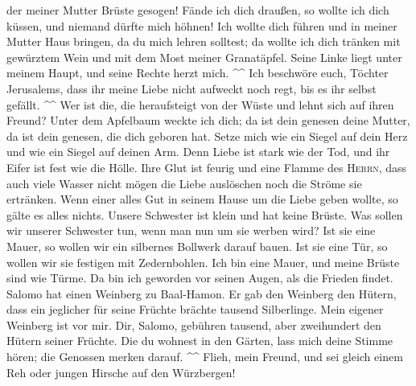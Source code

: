 der meiner Mutter Brüste gesogen! Fände ich dich draußen, so wollte ich
dich küssen, und niemand dürfte mich höhnen!  Ich wollte
dich führen und in meiner Mutter Haus bringen, da du mich lehren
solltest; da wollte ich dich tränken mit gewürztem Wein und mit dem Most
meiner Granatäpfel.  Seine Linke liegt unter meinem Haupt,
und seine Rechte herzt mich. \^{}\^{}  Ich beschwöre euch,
Töchter Jerusalems, dass ihr meine Liebe nicht aufweckt noch regt, bis
es ihr selbst gefällt. \^{}\^{}  Wer ist die, die
heraufsteigt von der Wüste und lehnt sich auf ihren Freund? Unter dem
Apfelbaum weckte ich dich; da ist dein genesen deine Mutter, da ist dein
genesen, die dich geboren hat.  Setze mich wie ein Siegel
auf dein Herz und wie ein Siegel auf deinen Arm. Denn Liebe ist stark
wie der Tod, und ihr Eifer ist fest wie die Hölle. Ihre Glut ist feurig
und eine Flamme des \textsc{Herrn},  dass auch viele
Wasser nicht mögen die Liebe auslöschen noch die Ströme sie ertränken.
Wenn einer alles Gut in seinem Hause um die Liebe geben wollte, so gälte
es alles nichts.  Unsere Schwester ist klein und hat keine
Brüste. Was sollen wir unserer Schwester tun, wenn man nun um sie werben
wird?  Ist sie eine Mauer, so wollen wir ein silbernes
Bollwerk darauf bauen. Ist sie eine Tür, so wollen wir sie festigen mit
Zedernbohlen.  Ich bin eine Mauer, und meine Brüste sind
wie Türme. Da bin ich geworden vor seinen Augen, als die Frieden findet.
 Salomo hat einen Weinberg zu Baal-Hamon. Er gab den
Weinberg den Hütern, dass ein jeglicher für seine Früchte brächte
tausend Silberlinge.  Mein eigener Weinberg ist vor mir.
Dir, Salomo, gebühren tausend, aber zweihundert den Hütern seiner
Früchte.  Die du wohnest in den Gärten, lass mich deine
Stimme hören; die Genossen merken darauf. \^{}\^{} 
Flieh, mein Freund, und sei gleich einem Reh oder jungen Hirsche auf den
Würzbergen!
